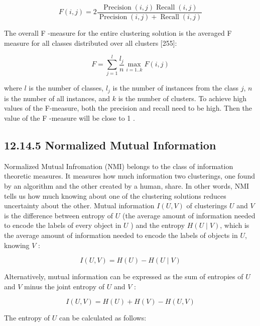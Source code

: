 \documentclass[10pt]{book}
\begin{document}
\begin{equation*}
F(i, j)=2 \frac{\operatorname{Precision}(i, j) \operatorname{Recall}(i, j)}{\operatorname{Precision}(i, j)+\operatorname{Recall}(i, j)} \tag{12.47}
\end{equation*}


The overall F -measure for the entire clustering solution is the averaged F measure for all classes distributed over all clusters [255]:


\begin{equation*}
F=\sum_{j=1}^{l} \frac{l_{j}}{n} \max _{i=1 . . k} F(i, j) \tag{12.48}
\end{equation*}


where $l$ is the number of classes, $l_{j}$ is the number of instances from the class $j$, $n$ is the number of all instances, and $k$ is the number of clusters. To achieve high values of the F-measure, both the precision and recall need to be high. Then the value of the F -measure will be close to 1 .

\subsection*{12.14.5 Normalized Mutual Information}
Normalized Mutual Infromation (NMI) belongs to the class of information theoretic measures. It measures how much information two clusterings, one found by an algorithm and the other created by a human, share. In other words, NMI tells us how much knowing about one of the clustering solutions reduces uncertainty about the other. Mutual information $I(U, V)$ of clusterings $U$ and $V$ is the difference between entropy of $U$ (the average amount of information needed to encode the labels of every object in $U$ ) and the entropy $H(U \mid V)$, which is the average amount of information needed to encode the labels of objects in $U$, knowing $V$ :


\begin{equation*}
I(U, V)=H(U)-H(U \mid V) \tag{12.49}
\end{equation*}


Alternatively, mutual information can be expressed as the sum of entropies of $U$ and $V$ minus the joint entropy of $U$ and $V$ :


\begin{equation*}
I(U, V)=H(U)+H(V)-H(U, V) \tag{12.50}
\end{equation*}


The entropy of $U$ can be calculated as follows:
\end{document}
